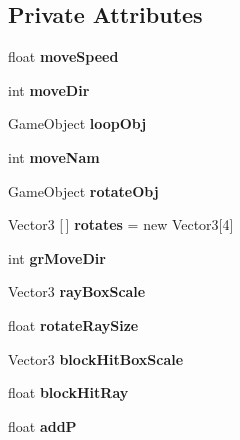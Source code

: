 \subsection*{Private Attributes}
\begin{DoxyCompactItemize}
\item 
\mbox{\label{class_spider_afd381ae1b1753300ee1bb74a2eb7a93e}} 
float {\bfseries move\+Speed}
\item 
\mbox{\label{class_spider_a49583aa395e30433618e7c8eb947d901}} 
int {\bfseries move\+Dir}
\item 
\mbox{\label{class_spider_a68c8dac310674216bb405ee6c04551b2}} 
Game\+Object {\bfseries loop\+Obj}
\item 
\mbox{\label{class_spider_a6db606b31f542233e0c6c7eca5538bc4}} 
int {\bfseries move\+Nam}
\item 
\mbox{\label{class_spider_a020303fec599033bb28b0d4419547a61}} 
Game\+Object {\bfseries rotate\+Obj}
\item 
\mbox{\label{class_spider_a9256fbf6711cb74827c87f6bab37a3df}} 
Vector3 \mbox{[}$\,$\mbox{]} {\bfseries rotates} = new Vector3\mbox{[}4\mbox{]}
\item 
\mbox{\label{class_spider_a382131f549546afab08794b80e945712}} 
int {\bfseries gr\+Move\+Dir}
\item 
\mbox{\label{class_spider_ab7eea4f2e27b225c654979e1ccb7bf4c}} 
Vector3 {\bfseries ray\+Box\+Scale}
\item 
\mbox{\label{class_spider_ae4d9632ec140a93eceaaa0cf53381d16}} 
float {\bfseries rotate\+Ray\+Size}
\item 
\mbox{\label{class_spider_a1535104480eb96680d7a22a8572ebce9}} 
Vector3 {\bfseries block\+Hit\+Box\+Scale}
\item 
\mbox{\label{class_spider_a36da8def17a89fa2cfa3f531d25f9539}} 
float {\bfseries block\+Hit\+Ray}
\item 
\mbox{\label{class_spider_ad79073d9e3f212b722050cb0978bed8d}} 
float {\bfseries addP}
\end{DoxyCompactItemize}
